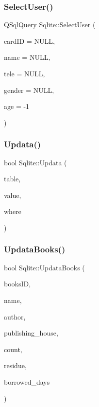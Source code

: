 \mbox{\label{class_sqlite_aa540de99093cdea8160088a2c69872ee}} 
\subsubsection{\texorpdfstring{SelectUser()}{SelectUser()}}
{\footnotesize\ttfamily Q\+Sql\+Query Sqlite\+::\+Select\+User (\begin{DoxyParamCaption}\item[{Q\+String}]{card\+ID = {\ttfamily NULL},  }\item[{Q\+String}]{name = {\ttfamily NULL},  }\item[{Q\+String}]{tele = {\ttfamily NULL},  }\item[{Q\+String}]{gender = {\ttfamily NULL},  }\item[{int}]{age = {\ttfamily -\/1} }\end{DoxyParamCaption})}

\mbox{\label{class_sqlite_ae014031d1e0b0d9c412fb72ddc5a0043}} 
\subsubsection{\texorpdfstring{Updata()}{Updata()}}
{\footnotesize\ttfamily bool Sqlite\+::\+Updata (\begin{DoxyParamCaption}\item[{Q\+String}]{table,  }\item[{Q\+String}]{value,  }\item[{Q\+String}]{where }\end{DoxyParamCaption})}

\mbox{\label{class_sqlite_a6fc03a68c321e300dc540d0a48eabc70}} 
\subsubsection{\texorpdfstring{UpdataBooks()}{UpdataBooks()}}
{\footnotesize\ttfamily bool Sqlite\+::\+Updata\+Books (\begin{DoxyParamCaption}\item[{Q\+String}]{books\+ID,  }\item[{Q\+String}]{name,  }\item[{Q\+String}]{author,  }\item[{Q\+String}]{publishing\+\_\+house,  }\item[{int}]{count,  }\item[{int}]{residue,  }\item[{int}]{borrowed\+\_\+days }\end{DoxyParamCaption})}

